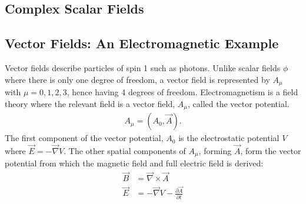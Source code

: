 \documentclass[a4paper,11pt]{article}
\numberwithin{equation}{section}
\theoremstyle{definition}
\begin{document}
\subsection{Complex Scalar Fields}  

\subsection{Vector Fields: An Electromagnetic Example}

Vector fields describe particles of spin 1 such as photons. Unlike scalar fields $\phi$ where there is only one degree of freedom, a vector field is represented by $A_\mu$ with $\mu = 0,1,2,3$, hence having 4 degrees of freedom. Electromagnetism is a field theory where the relevant field is a vector field, $A_\mu$, called the vector potential.
\begin{align*}
A_\mu = (A_0, \vec{A}).
\end{align*}
The first component of the vector potential, $A_0$ is the electrostatic potential $V$ where $\vec{E} = -\vec{\nabla}V$. The other spatial components of $A_\mu$, forming $\vec{A}$, form the vector potential from which the magnetic field and full electric field is derived:
\begin{align*}
\vec{B} &= \vec{\nabla}\times \vec{A}\\
\vec{E} &= -\vec{\nabla}V - \frac{\partial \vec{A}}{\partial t}
\end{align*}
\end{document}

